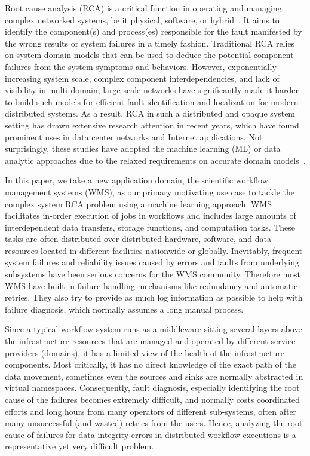 Root cause analysis (RCA) is a critical function in operating and managing complex networked systems, be it physical, software, or hybrid~\cite{RCA-Review-2017}.
It aims to identify the component(s) and process(es) responsible for the fault manifested by the wrong results or system failures in a timely fashion.
Traditional RCA relies on system domain models that can be used to deduce the potential component failures from the system symptoms and behaviors.
However, exponentially increasing system scale, complex component interdependencies, and lack of visibility in multi-domain, large-scale networks have 
significantly made it harder to build such models for efficient fault identification and localization for modern distributed systems. 
As a result, RCA in such a distributed and opaque system setting has drawn extensive research attention in recent years, which have found prominent uses
 in data center networks and Internet applications. Not surprisingly, these studies have adopted the machine learning (ML) or data analytic approaches
due to the relaxed requirements on accurate domain models~\cite{netbouncer:nsdi18,Link-JIoT-2019}.

In this paper, we take a new application domain, the scientific workflow management systems (WMS), as our primary motivating use case to tackle the complex
 system RCA problem using a machine learning approach. WMS facilitates in-order execution of jobs in workflows and includes large amounts of interdependent
  data transfers, storage functions, and computation tasks. These tasks are often distributed over distributed hardware, software, and data resources
   located in different facilities nationwide or globally. Inevitably, frequent system failures and reliability issues 
caused by errors and faults from underlying subsystems have been serious concerns for the WMS community. 
Therefore most WMS have built-in failure handling mechanisms like redundancy and automatic retries. 
They also try to provide as much log information as possible to help with failure diagnosis, which normally assumes a long manual process.

Since a typical workflow system runs as a middleware sitting several layers above the infrastructure resources that are managed 
and operated by different service providers (domains), it has a limited view of the health of the infrastructure components. 
Most critically, it has no direct knowledge of the exact path of the data movement,
sometimes even the sources and sinks are normally abstracted in virtual namespaces.  
Consequently, fault diagnosis, especially identifying the root cause of the failures becomes extremely difficult, and normally 
costs coordinated efforts and long hours from many operators of different sub-systems, often after many unsuccessful (and wasted) retries from the users. 
Hence, analyzing the root cause of failures for data integrity errors in distributed workflow executions is a representative yet very difficult problem.

